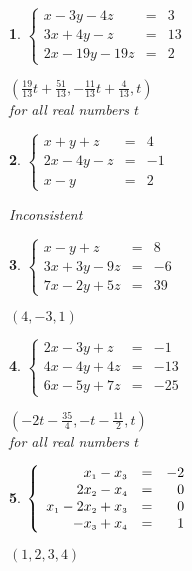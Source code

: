 \documentclass{amsbook}
\newtheorem{exc}{}
\newenvironment{ex}{\begin{exc}\normalfont}{\end{exc}}
\numberwithin{section}{chapter}
\numberwithin{equation}{chapter}
\begin{document}
\begin{multicols}{2}
\begin{ex}
	 $\left\{ \begin{array}{rcr} x-3y-4z & = & 3 \\ 3x+4y-z & = & 13 \\ 2x-19y-19z & = & 2  \end{array} \right.$
	\begin{sol}
		 $\left(\frac{19}{13} t + \frac{51}{13},-\frac{11}{13} t+\frac{4}{13},t\right)$\\
		for all real numbers $t$
	\end{sol}
\end{ex}


\begin{ex}
	$\left\{ \begin{array}{rcr} x+y+z & = & 4 \\ 2x-4y-z& = & -1 \\ x-y & = & 2 \end{array} \right.$
	\begin{sol}
		Inconsistent
	\end{sol}
\end{ex}

\begin{ex}
	 $\left\{ \begin{array}{rcr} x-y+z & = & 8 \\ 3x+3y-9z & = & -6 \\  7x-2y+5z & = & 39 \end{array} \right.$
	\begin{sol}
		 $\left(4,-3,1\right)$
	\end{sol}
\end{ex}

\begin{ex}
	$\left\{ \begin{array}{rcr} 2x-3y+z & = & -1 \\ 4x-4y+4z & = & -13 \\ 6x-5y+7z & = & -25  \end{array} \right.$
	\begin{sol}
		$\left(-2t - \frac{35}{4},-t - \frac{11}{2},t\right)$\\
		for all real numbers $t$
	\end{sol}
\end{ex}

\begin{ex}
	$\left\{ \begin{array}{rcr} x_{\mbox{\tiny$1$}} - x_{\mbox{\tiny$3$}} & = & -2 \\ 
	2x_{\mbox{\tiny$2$}} - x_{\mbox{\tiny$4$}} & = & 0  \\  
	x_{\mbox{\tiny$1$}} -  2x_{\mbox{\tiny$2$}} + x_{\mbox{\tiny$3$}} & = & 0 \\
	-x_{\mbox{\tiny$3$}} + x_{\mbox{\tiny$4$}} & = & 1  \end{array} \right.$
	\begin{sol}
		$(1, 2, 3, 4)$
	\end{sol}
\end{ex}

\end{multicols}
\end{document}
